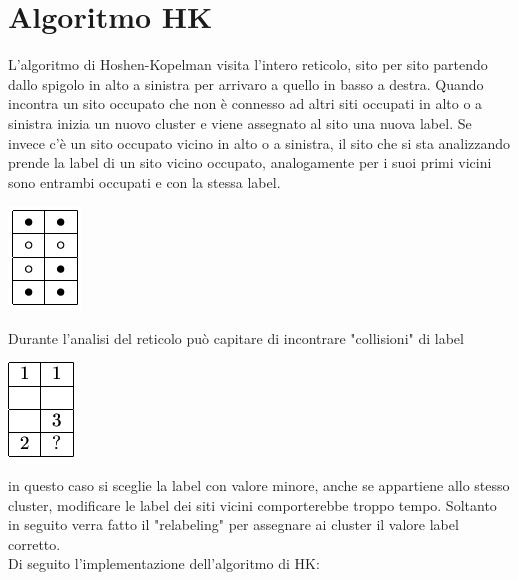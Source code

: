 \documentclass[10pt,a4paper]{article}
\begin{document}
\section{Algoritmo HK}
L'algoritmo di Hoshen-Kopelman visita l'intero reticolo, sito per sito partendo dallo spigolo in alto a sinistra per arrivaro a quello in basso a destra. Quando incontra un sito occupato che non è connesso ad altri siti occupati in alto o a sinistra inizia un nuovo cluster e viene assegnato al sito una nuova label. Se invece c'è un sito occupato vicino in alto o a sinistra, il sito che si sta analizzando prende la label di un sito vicino occupato, analogamente per i suoi primi vicini sono entrambi occupati e con la stessa label. \\
\begin{center}
\includegraphics[scale=0.6]{cl1.png}
\end{center}
Durante l'analisi del reticolo può capitare di incontrare "collisioni" di label
\begin{center}
\includegraphics[scale=0.6]{cl2.png}
\end{center}
in questo caso si sceglie la label con valore minore, anche se appartiene allo stesso cluster, modificare le label dei siti vicini comporterebbe troppo tempo. Soltanto in seguito verra fatto il "relabeling" per assegnare ai cluster il valore label corretto.\\
Di seguito l'implementazione dell'algoritmo di HK:\\
\end{document}
